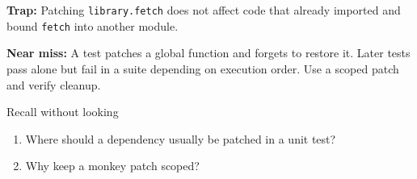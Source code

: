 \documentclass[11pt]{article}
\begin{document}
\begin{keepsection}
\begin{notebox}\textbf{Trap:} Patching \texttt{library.fetch} does not affect code that already imported and bound \texttt{fetch} into another module.\end{notebox}

\begin{notebox}\textbf{Near miss:} A test patches a global function and forgets to restore it. Later tests pass alone but fail in a suite depending on execution order. Use a scoped patch and verify cleanup.\end{notebox}

\begin{recallbox}{Recall without looking}
\begin{enumerate}
\item Where should a dependency usually be patched in a unit test?
\item Why keep a monkey patch scoped?
\end{enumerate}

\end{recallbox}
\end{keepsection}
\end{document}
